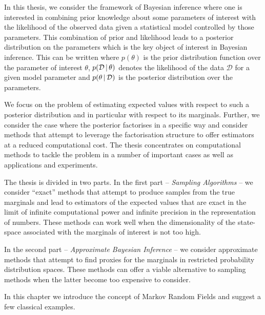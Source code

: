 
In this thesis, we consider the framework of Bayesian inference where one is interested in combining prior knowledge about some parameters of interest with the likelihood of the observed data given a statistical model controlled by those parameters. This combination of prior and likelihood leads to a posterior distribution on the parameters which is the key object of interest in Bayesian inference. This can be written
where $p(\theta)$ is the prior distribution function over the parameter of interest $\theta$, $p(\mathcal D\,|\, \theta)$ denotes the likelihood of the data $\mathcal D$ for a given model parameter and $p(\theta\,|\, \mathcal D)$ is the posterior distribution over the parameters. 

We focus on the problem of estimating expected values with respect to such a posterior distribution and in particular with respect to its marginals. Further, we consider the case where the posterior factorises in a specific way and consider methods that attempt to leverage the factorisation structure to offer estimators at a reduced computational cost. The thesis concentrates on computational methods to tackle the problem in a number of important cases as well as applications and experiments. 

The thesis is divided in two parts. In the first part -- \emph{Sampling Algorithms} -- we consider ``exact'' methods that attempt to produce samples from the true marginals and lead to estimators of the expected values that are exact in the limit of infinite computational power and infinite precision in the representation of numbers. These methods can work well when the dimensionality of the state-space associated with the marginals of interest is not too high. 

In the second part -- \emph{Approximate Bayesian Inference} -- we consider approximate methods that attempt to find proxies for the marginals in restricted probability distribution spaces. These methods can offer a viable alternative to sampling methods when the latter become too expensive to consider. 

In this chapter we introduce the concept of Markov Random Fields and suggest a few classical examples.

